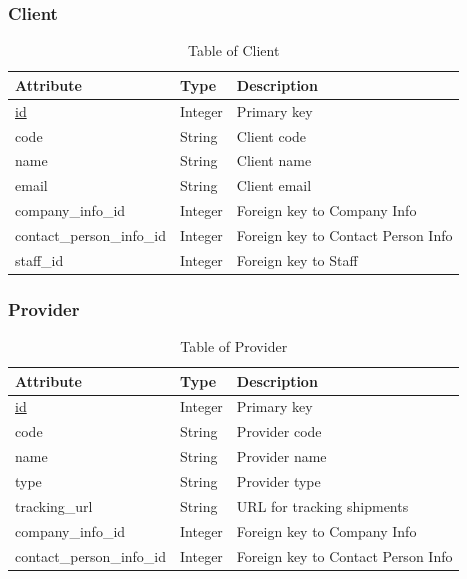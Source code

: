 \subsubsection{Client}
\begin{table}[H]
    \centering
    \begin{tabular}{|p{4cm}|p{2cm}|p{\dimexpr\textwidth-7.8cm}|} %
        \hline
        \rowcolor[HTML]{C0C0C0} 
        \textbf{Attribute} & \textbf{Type} & \textbf{Description} \\ \hline
        \underline{id} & Integer & Primary key \\ \hline
        code & String & Client code \\ \hline
        name & String & Client name \\ \hline
        email & String & Client email \\ \hline
        company\_info\_id & Integer & Foreign key to Company Info \\ \hline
        contact\_person\_info\_id & Integer & Foreign key to Contact Person Info \\ \hline
        staff\_id & Integer & Foreign key to Staff \\ \hline
    \end{tabular}
    \caption{Table of Client}
    \label{tab:client-table}
\end{table}

\subsubsection{Provider}
\begin{table}[H]
    \centering
    \begin{tabular}{|p{4cm}|p{2cm}|p{\dimexpr\textwidth-7.8cm}|} %
        \hline
        \rowcolor[HTML]{C0C0C0} 
        \textbf{Attribute} & \textbf{Type} & \textbf{Description} \\ \hline
        \underline{id} & Integer & Primary key \\ \hline
        code & String & Provider code \\ \hline
        name & String & Provider name \\ \hline
        type & String & Provider type \\ \hline
        tracking\_url & String & URL for tracking shipments \\ \hline
        company\_info\_id & Integer & Foreign key to Company Info \\ \hline
        contact\_person\_info\_id & Integer & Foreign key to Contact Person Info \\ \hline
    \end{tabular}
    \caption{Table of Provider}
    \label{tab:provider-table}
\end{table}

